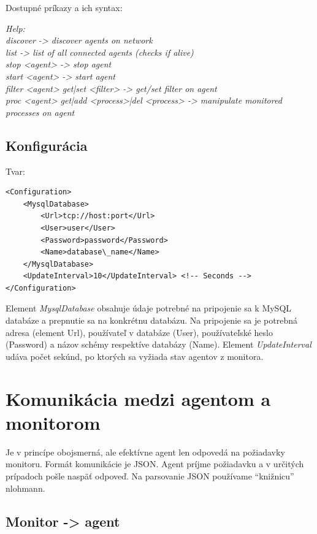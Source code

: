 \documentclass[a4paper,12pt]{article}
\begin{document}
\noindent Dostupné príkazy a ich syntax:

\noindent \textit{Help: \\
discover -> discover agents on network \\
list -> list of all connected agents (checks if alive) \\
stop <agent> -> stop agent \\
start <agent> -> start agent \\
filter <agent> get|set <filter> -> get/set filter on agent \\
proc <agent> get|add <process>|del <process> -> manipulate monitored processes on agent} \\

\subsection{Konfigurácia}

Tvar: \\ 
\begin{lstlisting}
<Configuration> 
	<MysqlDatabase> 
		<Url>tcp://host:port</Url> 
		<User>user</User> 
		<Password>password</Password> 
		<Name>database\_name</Name> 
	</MysqlDatabase> 
	<UpdateInterval>10</UpdateInterval> <!-- Seconds --> 
</Configuration> 
\end{lstlisting}

Element \textit{MysqlDatabase} obsahuje údaje potrebné na pripojenie sa k MySQL databáze a prepnutie sa na konkrétnu databázu. Na pripojenie sa je potrebná adresa (element Url), používateľ v databáze (User), používateľské heslo (Password) a názov schémy respektíve databázy (Name). Element \textit{UpdateInterval} udáva počet sekúnd, po ktorých sa vyžiada stav agentov z monitora. \\
\newpage

\section{Komunikácia medzi agentom a monitorom}
Je v princípe obojsmerná, ale efektívne agent len odpovedá na požiadavky monitoru. Formát komunikácie je JSON. Agent príjme požiadavku a v určitých prípadoch pošle naspäť odpoveď. Na parsovanie JSON používame “knižnicu” nlohmann.

\subsection{Monitor -> agent}
\end{document}
